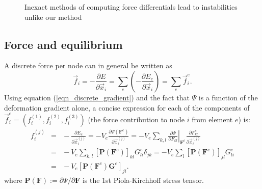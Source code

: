 \begin{figure}[th]
\caption{Inexact methods of computing force differentials lead to instabilities
unlike our method}
\label{fig:warpedstiff}
\end{figure}

\subsection{Force and equilibrium}
\label{sec:force}

A discrete force per node can in general be written as
\begin{equation}
\vec{f}_i=-\frac{\partial E}{\partial\vec{x}_i}=\sum_e\left(-\frac{\partial E_e}{\partial\vec{x}_i}\right)=\sum_e\vec{f}_i^e.
\label{eqn_elemental_forces}
\end{equation}
 Using equation (\ref{eqn_discrete_gradient}) and the fact that $\Psi$ is a function of the deformation gradient alone, a concise expression for each of the components
of $\vec{f}_i^e=(f_i^{(1)},f_i^{(2)},f_i^{(3)})$ (the force contribution to node $i$ from element $e$) is: 
\begin{eqnarray}
f_i^{(j)}\!\!\!&\!\!\!=\!\!\!&\!\!\!-\frac{\partial E_e}{\partial\vec{x}_i^{(j)}}=-V_e\frac{\partial\Psi(\mathbf{F}^e)}{\partial\vec{x}_i^{(j)}}
=
-V_e\sum_{k,l}\left.\frac{\partial\Psi}{\partial F_{kl}}\right|_{\mathbf{F}^e}\frac{\partial F_{kl}^e}{\partial\vec{x}_i^{(j)}} \nonumber \\
\!\!\!&\!\!\!=\!\!\!&\!\!\!
-V_e\sum_{k,l}[\mathbf{P}(\mathbf{F}^e)]_{kl}G_{li}^e\delta_{jk}
=
-V_e\sum_l[\mathbf{P}(\mathbf{F}^e)]_{jl}G_{li}^e \nonumber \\
\!\!\!&\!\!\!=\!\!\!&\!\!\!
-V_e[\mathbf{P}(\mathbf{F}^e)\mathbf{G}^e]_{ji}.
\label{eqn_nodal_forces}
\end{eqnarray}
where $\mathbf{P}(\mathbf{F})\!:=\!\partial\Psi/\partial\mathbf{F}$ is
the 1st Piola-Kirchhoff stress tensor.

